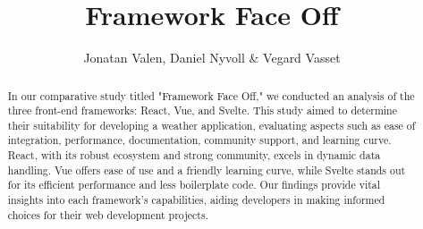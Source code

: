 \documentclass[11pt]{article}
\begin{document}
\title{\Huge Framework Face Off}
\author{Jonatan Valen, Daniel Nyvoll \& Vegard Vasset}
\maketitle

\begin{abstract}
  In our comparative study titled "Framework Face Off," we conducted an analysis of the three front-end frameworks: React, Vue, and Svelte. This study aimed to determine their suitability for developing a weather application, evaluating aspects such as ease of integration, performance, documentation, community support, and learning curve. React, with its robust ecosystem and strong community, excels in dynamic data handling. Vue offers ease of use and a friendly learning curve, while Svelte stands out for its efficient performance and less boilerplate code. Our findings provide vital insights into each framework's capabilities, aiding developers in making informed choices for their web development projects.

\end{abstract}

% 








\printbibliography
\end{document}
